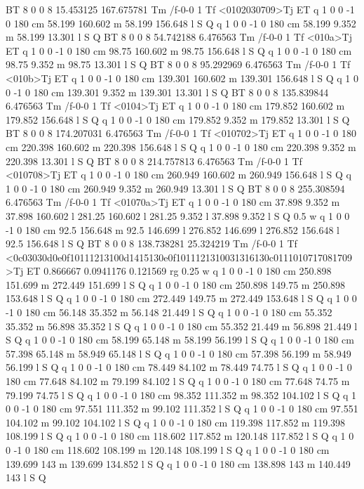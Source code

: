 BT
8 0 0 8 15.453125 167.675781 Tm
/f-0-0 1 Tf
<0102030709>Tj
ET
q 1 0 0 -1 0 180 cm
58.199 160.602 m 58.199 156.648 l S Q
q 1 0 0 -1 0 180 cm
58.199 9.352 m 58.199 13.301 l S Q
BT
8 0 0 8 54.742188 6.476563 Tm
/f-0-0 1 Tf
<010a>Tj
ET
q 1 0 0 -1 0 180 cm
98.75 160.602 m 98.75 156.648 l S Q
q 1 0 0 -1 0 180 cm
98.75 9.352 m 98.75 13.301 l S Q
BT
8 0 0 8 95.292969 6.476563 Tm
/f-0-0 1 Tf
<010b>Tj
ET
q 1 0 0 -1 0 180 cm
139.301 160.602 m 139.301 156.648 l S Q
q 1 0 0 -1 0 180 cm
139.301 9.352 m 139.301 13.301 l S Q
BT
8 0 0 8 135.839844 6.476563 Tm
/f-0-0 1 Tf
<0104>Tj
ET
q 1 0 0 -1 0 180 cm
179.852 160.602 m 179.852 156.648 l S Q
q 1 0 0 -1 0 180 cm
179.852 9.352 m 179.852 13.301 l S Q
BT
8 0 0 8 174.207031 6.476563 Tm
/f-0-0 1 Tf
<010702>Tj
ET
q 1 0 0 -1 0 180 cm
220.398 160.602 m 220.398 156.648 l S Q
q 1 0 0 -1 0 180 cm
220.398 9.352 m 220.398 13.301 l S Q
BT
8 0 0 8 214.757813 6.476563 Tm
/f-0-0 1 Tf
<010708>Tj
ET
q 1 0 0 -1 0 180 cm
260.949 160.602 m 260.949 156.648 l S Q
q 1 0 0 -1 0 180 cm
260.949 9.352 m 260.949 13.301 l S Q
BT
8 0 0 8 255.308594 6.476563 Tm
/f-0-0 1 Tf
<01070a>Tj
ET
q 1 0 0 -1 0 180 cm
37.898 9.352 m 37.898 160.602 l 281.25 160.602 l 281.25 9.352 l 37.898 
9.352 l S Q
0.5 w
q 1 0 0 -1 0 180 cm
92.5 156.648 m 92.5 146.699 l 276.852 146.699 l 276.852 156.648 l 92.5 
156.648 l S Q
BT
8 0 0 8 138.738281 25.324219 Tm
/f-0-0 1 Tf
<0c03030d0e0f10111213100d1415130e0f1011121310031316130c0111010717081709>Tj
ET
0.866667 0.0941176 0.121569 rg
0.25 w
q 1 0 0 -1 0 180 cm
250.898 151.699 m 272.449 151.699 l S Q
q 1 0 0 -1 0 180 cm
250.898 149.75 m 250.898 153.648 l S Q
q 1 0 0 -1 0 180 cm
272.449 149.75 m 272.449 153.648 l S Q
q 1 0 0 -1 0 180 cm
56.148 35.352 m 56.148 21.449 l S Q
q 1 0 0 -1 0 180 cm
55.352 35.352 m 56.898 35.352 l S Q
q 1 0 0 -1 0 180 cm
55.352 21.449 m 56.898 21.449 l S Q
q 1 0 0 -1 0 180 cm
58.199 65.148 m 58.199 56.199 l S Q
q 1 0 0 -1 0 180 cm
57.398 65.148 m 58.949 65.148 l S Q
q 1 0 0 -1 0 180 cm
57.398 56.199 m 58.949 56.199 l S Q
q 1 0 0 -1 0 180 cm
78.449 84.102 m 78.449 74.75 l S Q
q 1 0 0 -1 0 180 cm
77.648 84.102 m 79.199 84.102 l S Q
q 1 0 0 -1 0 180 cm
77.648 74.75 m 79.199 74.75 l S Q
q 1 0 0 -1 0 180 cm
98.352 111.352 m 98.352 104.102 l S Q
q 1 0 0 -1 0 180 cm
97.551 111.352 m 99.102 111.352 l S Q
q 1 0 0 -1 0 180 cm
97.551 104.102 m 99.102 104.102 l S Q
q 1 0 0 -1 0 180 cm
119.398 117.852 m 119.398 108.199 l S Q
q 1 0 0 -1 0 180 cm
118.602 117.852 m 120.148 117.852 l S Q
q 1 0 0 -1 0 180 cm
118.602 108.199 m 120.148 108.199 l S Q
q 1 0 0 -1 0 180 cm
139.699 143 m 139.699 134.852 l S Q
q 1 0 0 -1 0 180 cm
138.898 143 m 140.449 143 l S Q
